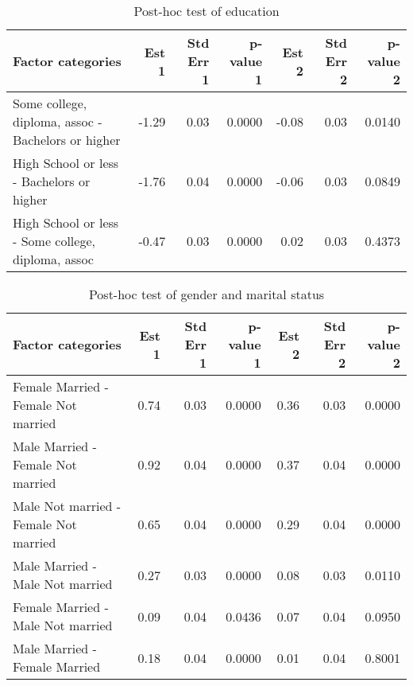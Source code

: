 \begin{table}[H]
\footnotesize
\centering
\begin{tabular}{lrrrrrr}
  \hline
  Factor categories & Est 1 & Std Err 1 & p-value 1 & Est 2 & Std Err 2 & p-value 2 \\ 
  \hline
   Some college, diploma, assoc - Bachelors or higher & -1.29 & 0.03 & 0.0000 & -0.08 & 0.03 & 0.0140 \\ 
   High School or less - Bachelors or higher & -1.76 & 0.04 & 0.0000 & -0.06 & 0.03 & 0.0849 \\ 
   High School or less - Some college, diploma, assoc & -0.47 & 0.03 & 0.0000 & 0.02 & 0.03 & 0.4373 \\ 
  \hline
\end{tabular}
\caption{Post-hoc test of education} 
\label{tab:Education}
\end{table}

\begin{table}[H]
\footnotesize
\centering
\begin{tabular}{lrrrrrr}
  \hline
  Factor categories & Est 1 & Std Err 1 & p-value 1 & Est 2 & Std Err 2 & p-value 2 \\ 
  \hline
    Female Married -  Female Not married & 0.74 & 0.03 & 0.0000 & 0.36 & 0.03 & 0.0000 \\ 
    Male Married -  Female Not married & 0.92 & 0.04 & 0.0000 & 0.37 & 0.04 & 0.0000 \\ 
    Male Not married -  Female Not married & 0.65 & 0.04 & 0.0000 & 0.29 & 0.04 & 0.0000 \\ 
    Male Married -  Male Not married & 0.27 & 0.03 & 0.0000 & 0.08 & 0.03 & 0.0110 \\ 
    Female Married -  Male Not married & 0.09 & 0.04 & 0.0436 & 0.07 & 0.04 & 0.0950 \\ 
    Male Married -  Female Married & 0.18 & 0.04 & 0.0000 & 0.01 & 0.04 & 0.8001 \\ 
  \hline
\end{tabular}
\caption{Post-hoc test of gender and marital status} 
\label{tab:GenderMS}
\end{table}

